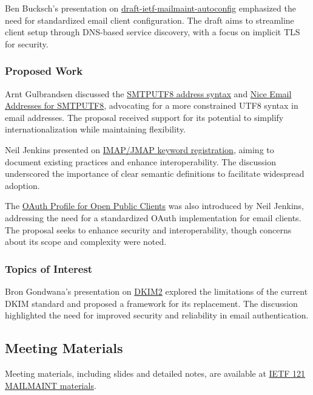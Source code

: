 \documentclass{article}
\begin{document}
Ben Bucksch's presentation on \href{https://datatracker.ietf.org/doc/html/draft-ietf-mailmaint-autoconfig}{draft-ietf-mailmaint-autoconfig} emphasized the need for standardized email client configuration. The draft aims to streamline client setup through DNS-based service discovery, with a focus on implicit TLS for security.

\subsubsection{Proposed Work}
Arnt Gulbrandsen discussed the \href{https://datatracker.ietf.org/doc/draft-gulbrandsen-smtputf8-syntax}{SMTPUTF8 address syntax} and \href{https://datatracker.ietf.org/doc/draft-gulbrandsen-smtputf8-nice-addresses}{Nice Email Addresses for SMTPUTF8}, advocating for a more constrained UTF8 syntax in email addresses. The proposal received support for its potential to simplify internationalization while maintaining flexibility.

Neil Jenkins presented on \href{https://datatracker.ietf.org/doc/draft-jenkins-mail-keywords}{IMAP/JMAP keyword registration}, aiming to document existing practices and enhance interoperability. The discussion underscored the importance of clear semantic definitions to facilitate widespread adoption.

The \href{https://datatracker.ietf.org/doc/draft-jenkins-oauth-public}{OAuth Profile for Open Public Clients} was also introduced by Neil Jenkins, addressing the need for a standardized OAuth implementation for email clients. The proposal seeks to enhance security and interoperability, though concerns about its scope and complexity were noted.

\subsubsection{Topics of Interest}
Bron Gondwana's presentation on \href{https://datatracker.ietf.org/doc/draft-gondwana-dkim2-motivation}{DKIM2} explored the limitations of the current DKIM standard and proposed a framework for its replacement. The discussion highlighted the need for improved security and reliability in email authentication.

\subsection{Meeting Materials}
Meeting materials, including slides and detailed notes, are available at \href{https://www.ietf.org/proceedings/121/mailmaint.html}{IETF 121 MAILMAINT materials}.
\end{document}
